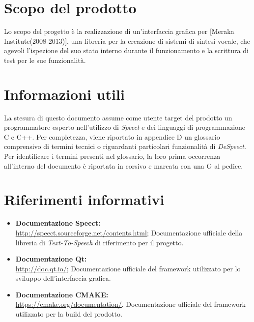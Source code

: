 \documentclass[openany,12pt,a4paper]{report}
\begin{document}
	\section{Scopo del prodotto}
	
	Lo scopo del progetto è la realizzazione di un’interfaccia grafica per  [Meraka Institute(2008-2013)], una libreria per la creazione di sistemi di sintesi vocale, che agevoli l’ispezione del suo stato interno durante il funzionamento e la scrittura di test per le sue funzionalità.
	
	\section{Informazioni utili}
	
	La stesura di questo documento assume come utente target del prodotto un programmatore esperto nell'utilizzo di \textit{Speect} e dei linguaggi di programmazione C e C++.
	Per completezza, viene riportato in appendice D un glossario comprensivo di termini tecnici o riguardanti particolari funzionalità di \textit{DeSpeect}. Per identificare i termini
	presenti nel glossario, la loro prima occorrenza all’interno del documento è riportata in corsivo e
	marcata con una G al pedice.
	
	\section{Riferimenti informativi}
	
	\begin{itemize}
		\item \textbf{Documentazione Speect:} \\
		\url{http://speect.sourceforge.net/contents.html};
		\subitem Documentazione ufficiale della libreria di \textit{Text-To-Speech} di riferimento per il progetto.
		
		\item \textbf{Documentazione Qt:} \\
		\url{http://doc.qt.io/};
		\subitem Documentazione ufficiale del framework utilizzato per lo sviluppo dell'interfaccia grafica.
		
		\item \textbf{Documentazione CMAKE:} \\
		\url{https://cmake.org/documentation/}.
		\subitem Documentazione ufficiale del framework utilizzato per la build del prodotto. 
	\end{itemize}
\end{document}
